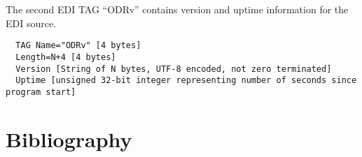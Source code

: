 The second EDI TAG ``ODRv'' contains version and uptime information for the EDI source.
\begin{lstlisting}
  TAG Name="ODRv" [4 bytes]
  Length=N+4 [4 bytes]
  Version [String of N bytes, UTF-8 encoded, not zero terminated]
  Uptime [unsigned 32-bit integer representing number of seconds since program start]
\end{lstlisting}


\section{Bibliography}



